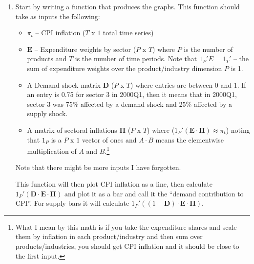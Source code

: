 \documentclass[12pt,english]{article}
\begin{document}
\begin{enumerate}
	\item Start by writing a function that produces the graphs. This function should take as inputs the following:
	\begin{itemize}
		\item $\pi_t$ -- CPI inflation ($T$ x $1$ total time series)
		\item $\mathbold{E}$ -- Expenditure weights by sector ($P$ x $T$) where $P$ is the number of products and $T$ is the number of time periods. Note that $1_P'E = 1_T'$ -- the sum of expenditure weights over the product/industry dimension $P$ is 1.
		\item A Demand shock matrix $\mathbold{D}$ ($P$ x $T$) where entries are between 0 and 1. If an entry is 0.75 for sector 3 in 2000Q1, then it means that in 2000Q1, sector 3 was 75\% affected by a demand shock and 25\% affected by a supply shock.
		\item A matrix of sectoral inflations $\mathbold{\Pi}$ ($P$ x $T$) where ($1_P'(\mathbold{E}\cdot \mathbold{\Pi})\approx \pi_t$) noting that $1_P$ is a $P$ x $1$ vector of ones and $A\cdot B$ means the elementwise multiplication of $A$ and $B$.\footnote{What I mean by this math is if you take the expenditure shares and scale them by inflation in each product/industry and then sum over products/industries, you should get CPI inflation and it should be close to the first input.}
	\end{itemize}
	Note that there might be more inputs I have forgotten. 
	
	This function will then plot CPI inflation as a line, then calculate $1_P'(\mathbold{D} \cdot \mathbold{E}\cdot \mathbold{\Pi})$ and plot it as a bar and call it the ``demand contribution to CPI''. For supply bars it will calculate $1_P'((1-\mathbold{D}) \cdot \mathbold{E}\cdot \mathbold{\Pi})$.
	

\end{enumerate}
\end{document}
